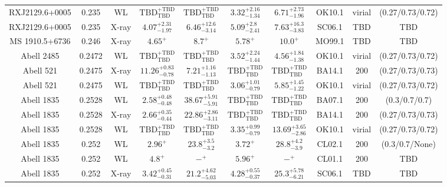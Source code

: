 \begin{table}
\begin{tabular}{cccccccccc}
RXJ2129.6+0005 & 0.235 & WL & ${\mathrm{TBD}}^{+\mathrm{TBD}}_{\mathrm{TBD}}$ & ${\mathrm{TBD}}^{+\mathrm{TBD}}_{\mathrm{TBD}}$ & ${3.32}^{+2.16}_{-1.34}$ & ${6.71}^{+2.73}_{-1.96}$ & OK10.1 & virial & (0.27/0.73/0.72) \\
RXJ2129.6+0005 & 0.235 & X-ray & ${4.07}^{+2.31}_{-1.97}$ & ${6.46}^{+12.6}_{-3.14}$ & ${5.09}^{+2.8}_{-2.41}$ & ${7.63}^{+16.3}_{-3.83}$ & SC06.1 & TBD & TBD \\
MS 1910.5+6736 & 0.246 & X-ray & ${4.65}^{+}_{}$ & ${8.7}^{+}_{}$ & ${5.78}^{+}_{}$ & ${10.0}^{+}_{}$ & MO99.1 & TBD & TBD \\
Abell 2485 & 0.2472 & WL & ${\mathrm{TBD}}^{+\mathrm{TBD}}_{\mathrm{TBD}}$ & ${\mathrm{TBD}}^{+\mathrm{TBD}}_{\mathrm{TBD}}$ & ${3.52}^{+2.24}_{-1.44}$ & ${4.56}^{+1.84}_{-1.38}$ & OK10.1 & virial & (0.27/0.73/0.72) \\
Abell 521 & 0.2475 & X-ray & ${11.26}^{+0.83}_{-0.78}$ & ${7.21}^{+1.16}_{-1.13}$ & ${\mathrm{TBD}}^{+\mathrm{TBD}}_{\mathrm{TBD}}$ & ${\mathrm{TBD}}^{+\mathrm{TBD}}_{\mathrm{TBD}}$ & BA14.1 & 200 & (0.27/0.73/0.73) \\
Abell 521 & 0.2475 & WL & ${\mathrm{TBD}}^{+\mathrm{TBD}}_{\mathrm{TBD}}$ & ${\mathrm{TBD}}^{+\mathrm{TBD}}_{\mathrm{TBD}}$ & ${3.06}^{+1.01}_{-0.79}$ & ${5.85}^{+1.45}_{-1.22}$ & OK10.1 & virial & (0.27/0.73/0.72) \\
Abell 1835 & 0.2528 & WL & ${2.58}^{+0.48}_{-0.48}$ & ${38.67}^{+5.91}_{-5.91}$ & ${\mathrm{TBD}}^{+\mathrm{TBD}}_{\mathrm{TBD}}$ & ${\mathrm{TBD}}^{+\mathrm{TBD}}_{\mathrm{TBD}}$ & BA07.1 & 200 & (0.3/0.7/0.7) \\
Abell 1835 & 0.2528 & X-ray & ${2.66}^{+0.35}_{-0.44}$ & ${22.86}^{+2.86}_{-3.11}$ & ${\mathrm{TBD}}^{+\mathrm{TBD}}_{\mathrm{TBD}}$ & ${\mathrm{TBD}}^{+\mathrm{TBD}}_{\mathrm{TBD}}$ & BA14.1 & 200 & (0.27/0.73/0.73) \\
Abell 1835 & 0.2528 & WL & ${\mathrm{TBD}}^{+\mathrm{TBD}}_{\mathrm{TBD}}$ & ${\mathrm{TBD}}^{+\mathrm{TBD}}_{\mathrm{TBD}}$ & ${3.35}^{+0.99}_{-0.79}$ & ${13.69}^{+3.65}_{-2.86}$ & OK10.1 & virial & (0.27/0.73/0.72) \\
Abell 1835 & 0.252 & WL & ${2.96}^{+}_{}$ & ${23.8}^{+3.5}_{-3.2}$ & ${3.72}^{+}_{}$ & ${28.8}^{+4.2}_{-3.9}$ & CL02.1 & 200 & (0.3/0.7/None) \\
Abell 1835 & 0.252 & WL & ${4.8}^{+}_{}$ & ${-}^{+}_{}$ & ${5.96}^{+}_{}$ & ${-}^{+}_{}$ & CL01.1 & 200 & TBD \\
Abell 1835 & 0.252 & X-ray & ${3.42}^{+0.45}_{-0.31}$ & ${21.2}^{+4.62}_{-5.03}$ & ${4.28}^{+0.55}_{-0.37}$ & ${25.3}^{+5.78}_{-6.21}$ & SC06.1 & TBD & TBD \\

\end{tabular}
\end{table}
